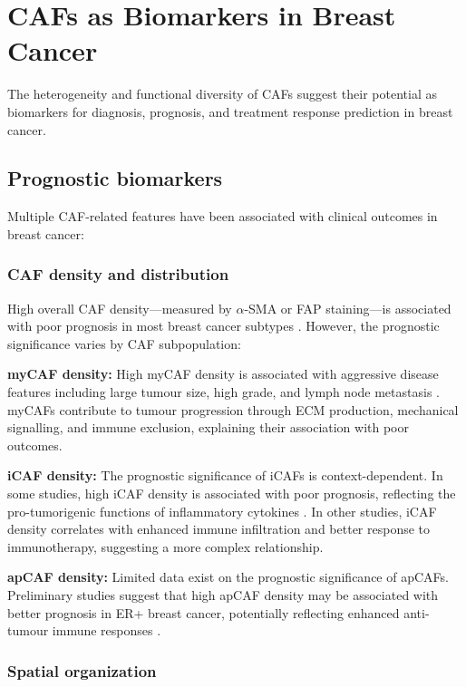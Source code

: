 \section{CAFs as Biomarkers in Breast Cancer}
\label{sec:biomarkers}

The heterogeneity and functional diversity of CAFs suggest their potential as biomarkers for diagnosis, prognosis, and treatment response prediction in breast cancer.

\subsection{Prognostic biomarkers}

Multiple CAF-related features have been associated with clinical outcomes in breast cancer:

\subsubsection{CAF density and distribution}

High overall CAF density---measured by $\alpha$-SMA or FAP staining---is associated with poor prognosis in most breast cancer subtypes \citep{erve2024}. However, the prognostic significance varies by CAF subpopulation:

\textbf{myCAF density:} High myCAF density is associated with aggressive disease features including large tumour size, high grade, and lymph node metastasis \citep{erve2024}. myCAFs contribute to tumour progression through ECM production, mechanical signalling, and immune exclusion, explaining their association with poor outcomes.

\textbf{iCAF density:} The prognostic significance of iCAFs is context-dependent. In some studies, high iCAF density is associated with poor prognosis, reflecting the pro-tumorigenic functions of inflammatory cytokines \citep{erve2024}. In other studies, iCAF density correlates with enhanced immune infiltration and better response to immunotherapy, suggesting a more complex relationship.

\textbf{apCAF density:} Limited data exist on the prognostic significance of apCAFs. Preliminary studies suggest that high apCAF density may be associated with better prognosis in ER+ breast cancer, potentially reflecting enhanced anti-tumour immune responses \citep{erve2024}.

\subsubsection{Spatial organization}


